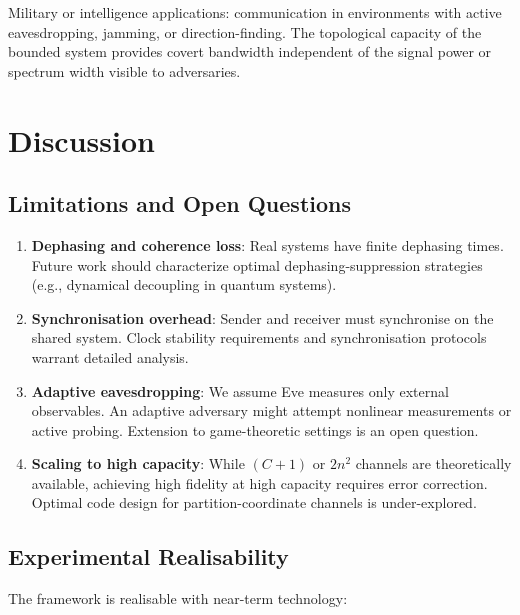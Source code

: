 \documentclass[11pt,twocolumn,a4paper]{article}
\theoremstyle{definition}
\begin{document}
Military or intelligence applications: communication in environments with active eavesdropping, jamming, or direction-finding. The topological capacity of the bounded system provides covert bandwidth independent of the signal power or spectrum width visible to adversaries.

\section{Discussion}
\label{sec:discussion}

\subsection{Limitations and Open Questions}

\begin{enumerate}[nosep]
\item \textbf{Dephasing and coherence loss}: Real systems have finite dephasing times. Future work should characterize optimal dephasing-suppression strategies (e.g., dynamical decoupling in quantum systems).

\item \textbf{Synchronisation overhead}: Sender and receiver must synchronise on the shared system. Clock stability requirements and synchronisation protocols warrant detailed analysis.

\item \textbf{Adaptive eavesdropping}: We assume Eve measures only external observables. An adaptive adversary might attempt nonlinear measurements or active probing. Extension to game-theoretic settings is an open question.

\item \textbf{Scaling to high capacity}: While $(C+1)$ or $2n^2$ channels are theoretically available, achieving high fidelity at high capacity requires error correction. Optimal code design for partition-coordinate channels is under-explored.
\end{enumerate}

\subsection{Experimental Realisability}

The framework is realisable with near-term technology:
\end{document}
